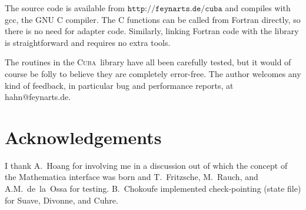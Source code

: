 \documentclass[12pt]{article}
\newcommand\cuba{\textsc{Cuba}}
\newcommand\Code[1]{\ensuremath{\texttt{#1}}}
\begin{document}
The source code is available from \Code{http://feynarts.de/cuba}
and compiles with gcc, the GNU C compiler.  The C functions can be
called from Fortran directly, so there is no need for adapter code. 
Similarly, linking Fortran code with the library is straightforward
and requires no extra tools.

The routines in the \cuba\ library have all been carefully tested, but
it would of course be folly to believe they are completely error-free. 
The author welcomes any kind of feedback, in particular bug and 
performance reports, at hahn@feynarts.de.


\section*{Acknowledgements}

I thank A.~Hoang for involving me in a discussion out of which the 
concept of the Mathematica interface was born and T.~Fritzsche, 
M.~Rauch, and A.M.~de~la~Ossa for testing.  B.~Chokoufe implemented
check-pointing (state file) for Suave, Divonne, and Cuhre.

\end{document}
